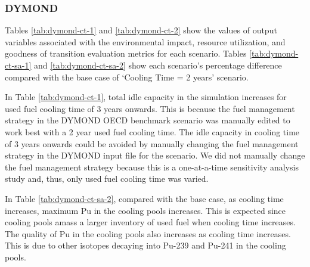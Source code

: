 \subsubsection{\textbf{DYMOND}}
Tables \ref{tab:dymond-ct-1} and \ref{tab:dymond-ct-2} show 
the values of 
output variables associated with the environmental impact, 
resource utilization, and goodness of transition evaluation 
metrics for each scenario. 
Tables \ref{tab:dymond-ct-sa-1} and \ref{tab:dymond-ct-sa-2} 
show each scenario's percentage 
difference compared with the base case of `Cooling Time = 2 years'
scenario.

In Table \ref{tab:dymond-ct-1}, total idle capacity 
in the simulation increases for used fuel cooling time of 3 years 
onwards. 
This is because the fuel management strategy in the 
DYMOND OECD benchmark scenario was 
manually edited to work best with a 2 year used fuel cooling time.
The idle capacity in cooling time of 3 years onwards could be 
avoided by manually changing the fuel management strategy
in the DYMOND input file for the scenario. 
We did not manually change the fuel management strategy
because this is a one-at-a-time sensitivity analysis study 
and, thus, only used fuel cooling time was varied. 

In Table \ref{tab:dymond-ct-sa-2}, compared with the base case, 
as cooling time increases, maximum Pu in the cooling pools increases.
This is expected since cooling pools amass a larger inventory of used fuel 
when cooling time increases. 
The quality of Pu in the cooling pools also increases as cooling time 
increases. 
This is due to other isotopes decaying into Pu-239 and Pu-241 in the 
cooling pools. 


